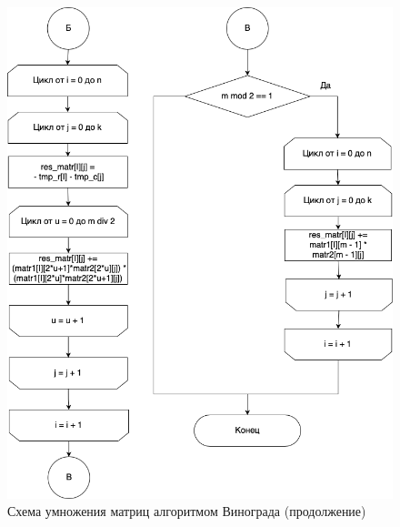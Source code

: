 \documentclass[a4paper,14pt, unknownkeysallowed]{extreport}
\begin{document}
\begin{figure}[h]
	\centering
	\includegraphics[scale=0.67]{img/winograd_alg_scheme2.png}
	\caption{Схема умножения матриц алгоритмом Винограда (продолжение)}
	\label{fig:winograd2}
\end{figure}

\clearpage
\end{document}
